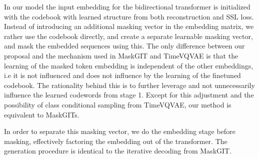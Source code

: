 \documentclass[../../thesis.tex]{subfiles}
\begin{document}
In our model the input embedding for the bidirectional transformer is initialized with the codebook with learned structure from both reconstruction and SSL loss. Instead of introducing an additional masking vector in the embedding matrix, we rather use the codebook directly, and create a separate learnable masking vector, and mask the embedded sequences using this. The only difference between our proposal and the mechanism used in MaskGIT and TimeVQVAE is that the learning of the masked token embedding is independent of the other embeddings, i.e it is not influenced and does not influence by the learning of the finetuned codebook. The rationality behind this is to further leverage and not unnecessarily influence the learned codewords from stage 1. Except for this adjustment and the possibility of class conditional sampling from TimeVQVAE, our method is equivalent to MaskGITs.
\newline

In order to separate this masking vector, we do the embedding stage before masking, effectively factoring the embedding out of the transformer. The generation procedure is identical to the iterative decoding from MaskGIT. 
\end{document}
